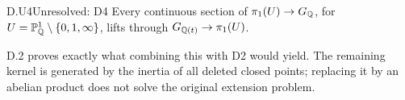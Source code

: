 \begin{claim}{D.U4}{Unresolved: D4}
Every continuous section of $\pi_1(U)\to G_\mathbb Q$, for
$U=\mathbb P^1_\mathbb Q\setminus\{0,1,\infty\}$, lifts through
$G_{\mathbb Q(t)}\to\pi_1(U)$.
\end{claim}
D.2 proves exactly what combining this with D2 would yield.
The remaining kernel is generated by the inertia of all deleted
closed points; replacing it by an abelian product does not solve
the original extension problem.

